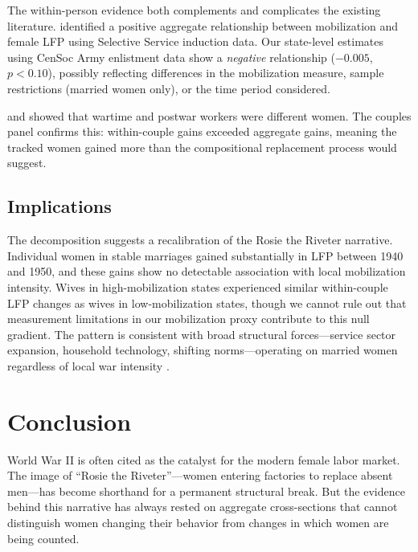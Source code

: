 \documentclass[12pt]{article}
\begin{document}
The within-person evidence both complements and complicates the existing literature. \citet{acemoglu2004women} identified a positive aggregate relationship between mobilization and female LFP using Selective Service induction data. Our state-level estimates using CenSoc Army enlistment data show a \textit{negative} relationship ($-0.005$, $p < 0.10$), possibly reflecting differences in the mobilization measure, sample restrictions (married women only), or the time period considered.

\citet{goldin1991role} and \citet{rose2018rise} showed that wartime and postwar workers were different women. The couples panel confirms this: within-couple gains exceeded aggregate gains, meaning the tracked women gained more than the compositional replacement process would suggest.

\subsection{Implications}

The decomposition suggests a recalibration of the Rosie the Riveter narrative. Individual women in stable marriages gained substantially in LFP between 1940 and 1950, and these gains show no detectable association with local mobilization intensity. Wives in high-mobilization states experienced similar within-couple LFP changes as wives in low-mobilization states, though we cannot rule out that measurement limitations in our mobilization proxy contribute to this null gradient. The pattern is consistent with broad structural forces---service sector expansion, household technology, shifting norms---operating on married women regardless of local war intensity \citep{greenwood2005engines, goldin2006quiet, fernandez2004mothers}.



\section{Conclusion}
\label{sec:conclusion}

World War II is often cited as the catalyst for the modern female labor market. The image of ``Rosie the Riveter''---women entering factories to replace absent men---has become shorthand for a permanent structural break. But the evidence behind this narrative has always rested on aggregate cross-sections that cannot distinguish women changing their behavior from changes in which women are being counted.
\end{document}
